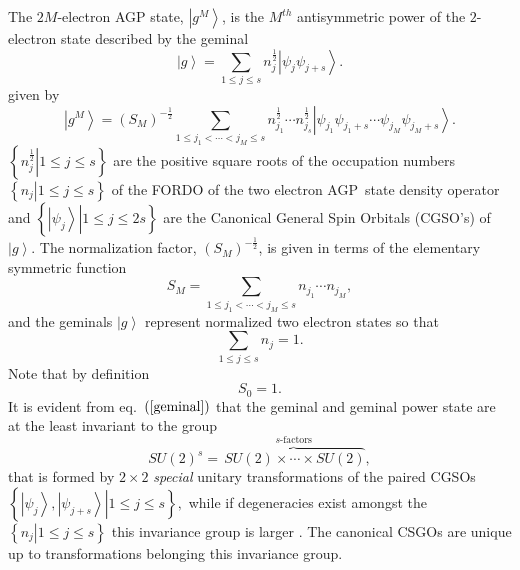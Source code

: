 \documentclass[aps,preprint]{revtex4}%
\begin{document}
\bigskip The $2M$-electron AGP state, $\left\vert g^{M}\right\rangle $, is the
$M^{th}$ antisymmetric power of the $2$-electron state described by the
geminal
\begin{equation}
\left\vert g\right\rangle =\sum_{1\leq j\leq s}n_{j}^{\frac{1}{2}}\left\vert
\psi_{j}\psi_{j+s}\right\rangle . \label{geminal}%
\end{equation}
given by
\begin{equation}
\left\vert g^{M}\right\rangle =\left(  S_{M}\right)  ^{-\frac{1}{2}}%
\sum_{1\leq j_{1}<\cdots<j_{M}\leq s}n_{j_{1}}^{\frac{1}{2}}\cdots n_{j_{s}%
}^{\frac{1}{2}}\left\vert \psi_{j_{1}}\psi_{j_{1}+s}\cdots\psi_{j_{M}}%
\psi_{j_{M}+s}\right\rangle . \label{agp}%
\end{equation}
$\left\{  \left.  n_{j}^{\frac{1}{2}}\right\vert 1\leq j\leq s\right\}  $ are
the positive square roots of the occupation numbers $\left\{  \left.
n_{j}\right\vert 1\leq j\leq s\right\}  $ of the FORDO of the two electron
AGP\ state density operator and $\left\{  \left.  \left\vert \psi
_{j}\right\rangle \right\vert 1\leq j\leq2s\right\}  $ are the Canonical
General Spin Orbitals (CGSO's) of $\left\vert g\right\rangle .$ The
normalization factor, $\left(  S_{M}\right)  ^{-\frac{1}{2}}$, is given in
terms of the elementary symmetric function
\begin{equation}
S_{M}=\sum_{1\leq j_{1}<\cdots<j_{M}\leq s}n_{j_{1}}\cdots n_{j_{M}},
\end{equation}
and the geminals $\left\vert g\right\rangle $ represent normalized two
electron states so that
\begin{equation}
\sum_{1\leq j\leq s}n_{j}=1.
\end{equation}
Note that by definition
\begin{equation}
S_{0}=1.
\end{equation}
It is evident from eq.\ $\left(  \ref{geminal}\right)  $ that the geminal and
geminal power state are at the least invariant to the group
\begin{equation}
SU\left(  2\right)  ^{s}=\overset{s\text{-factors}}{\overbrace{\,SU\left(
2\right)  \times\cdots\times SU\left(  2\right)  }},
\end{equation}
that is formed by $2\times2$ \emph{special} unitary transformations of the
paired CGSOs $\left\{  \left.  \left\vert \psi_{j}\right\rangle ,\left\vert
\psi_{j+s}\right\rangle \right\vert 1\leq j\leq s\right\}  ,$ while if
degeneracies exist amongst the $\left\{  \left.  n_{j}\right\vert 1\leq j\leq
s\right\}  $ this invariance group is larger \cite{AGPCoherent}. The canonical
CSGOs are unique up to transformations belonging this invariance group.
\end{document}
